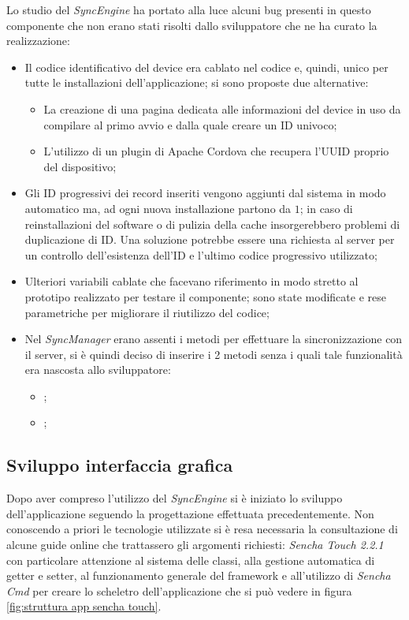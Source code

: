 Lo studio del \emph{SyncEngine} ha portato alla luce alcuni bug presenti in questo componente che non erano stati risolti dallo sviluppatore che ne ha curato la realizzazione:
\begin{itemize}
\item Il codice identificativo del device era cablato nel codice e, quindi, unico per tutte le installazioni dell'applicazione; si sono proposte due alternative:
	\begin{itemize}
	\item La creazione di una pagina dedicata alle informazioni del device in uso da compilare al primo avvio e dalla quale creare un ID univoco;
	\item L'utilizzo di un plugin di Apache Cordova che recupera l'\ac{UUID} proprio del dispositivo;
	\end{itemize}
\item Gli ID progressivi dei record inseriti vengono aggiunti dal sistema in modo automatico ma, ad ogni nuova installazione partono da $1$; in caso di reinstallazioni del software o di pulizia della cache insorgerebbero problemi di duplicazione di ID. Una soluzione potrebbe essere una richiesta al server per un controllo dell'esistenza dell'ID e l'ultimo codice progressivo utilizzato;
\item Ulteriori variabili cablate che facevano riferimento in modo stretto al prototipo realizzato per testare il componente; sono state modificate e rese parametriche per migliorare il riutilizzo del codice;
\item Nel \emph{SyncManager} erano assenti i metodi per effettuare la sincronizzazione con il server, si è quindi deciso di inserire i 2 metodi senza i quali tale funzionalità era nascosta allo sviluppatore:
	\begin{itemize}
	\item {};
	\item {};
	\end{itemize}
\end{itemize}



\subsection{Sviluppo interfaccia grafica}
Dopo aver compreso l'utilizzo del \emph{SyncEngine} si è iniziato lo sviluppo dell'applicazione seguendo la progettazione effettuata precedentemente.
Non conoscendo a priori le tecnologie utilizzate si è resa necessaria la consultazione di alcune guide online che trattassero gli argomenti richiesti: \emph{Sencha Touch 2.2.1}~\cite{sencha:touch221} con particolare attenzione al sistema delle classi, alla gestione automatica di getter e setter, al funzionamento generale del framework e all'utilizzo di \emph{Sencha Cmd} per creare lo scheletro dell'applicazione che si può vedere in figura \ref{fig:struttura app sencha touch}.

